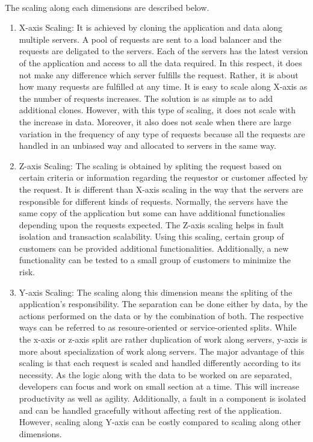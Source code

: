 \\
The scaling along each dimensions are described below. \cite{Fisher:2015aa}\cite{MacVittie:2014aa}\cite{Richardson:2014aa}
\begin{enumerate}
\item X-axis Scaling: It is achieved by cloning the application and data along multiple servers. A pool of requests are sent to a load balancer and the requests are deligated to the servers. Each of the servers has the latest version of the application and access to all the data required. In this respect, it does not make any difference which server fulfills the request. Rather, it is about how many requests are fulfilled at any time. It is easy to scale along X-axis as the number of requests increases. The solution is as simple as to add additional clones. However, with this type of scaling, it does not scale with the increase in data. Moreover, it also does not scale when there are large variation in the frequency of any type of requests because all the requests are handled in an unbiased way and allocated to servers in the same way.
\\
\item Z-axis Scaling: The scaling is obtained by spliting the request based on certain criteria or information regarding the requestor or customer affected by the request. It is different than X-axis scaling in the way that the servers are responsible for different kinds of requests. Normally, the servers have the same copy of the application but some can have additional functionalies depending upon the requests expected. The Z-axis scaling helps in fault isolation and transaction scalability. Using this scaling, certain group of customers can be provided additional functionalities. Additionally, a new functionality can be tested to a small group of customers to minimize the risk.
\\
\item Y-axis Scaling: The scaling along this dimension means the spliting of the application's responsibility. The separation can be done either by data, by the actions performed on the data or by the combination of both. The respective ways can be referred to as resoure-oriented or service-oriented splits. While the x-axis or z-axis split are rather duplication of work along servers, y-axis is more about specialization of work along servers. The major advantage of this scaling is that each request is scaled and handled differently according to its necessity. As the logic along with the data to be worked on are separated, developers can focus and work on small section at a time. This will increase productivity as well as agility. Additionally, a fault in a component is isolated and can be handled gracefully without affecting rest of the application. However, scaling along Y-axis can be costly compared to scaling along other dimensions.
\end{enumerate}
